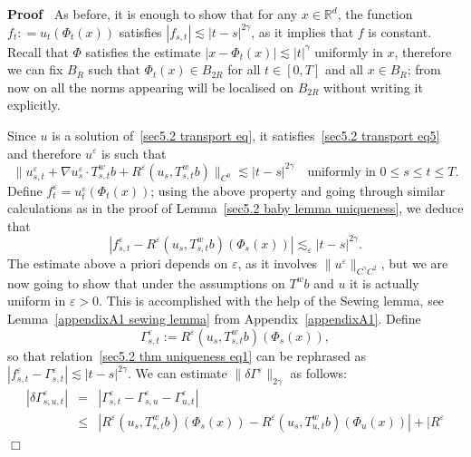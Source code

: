 \documentclass[10pt]{article}
\newcommand{\assign}{:=}
\newenvironment{proof}{\noindent\textbf{Proof\ }}{\hspace*{\fill}$\Box$\medskip}
\begin{document}
\begin{proof}
  As before, it is enough to show that for any $x \in \mathbb{R}^d$, the
  function $f_t : = u_t (\Phi_t (x))$ satisfies $| f_{s, t} | \lesssim | t - s
  |^{2 \gamma}$, as it implies that $f$ is constant. Recall that $\Phi$
  satisfies the estimate $| x - \Phi_t (x) | \lesssim | t |^{\gamma}$
  uniformly in $x$, therefore we can fix $B_R$ such that $\Phi_t (x) \in B_{2
  R}$ for all $t \in [0, T]$ and all $x \in B_R$; from now on all the norms
  appearing will be localised on $B_{2 R}$ without writing it explicitly.
  
  Since $u$ is a solution of~{\eqref{sec5.2 transport eq}}, it
  satisfies~{\eqref{sec5.2 transport eq5}} and therefore $u^{\varepsilon}$ is
  such that
  \[ \| u^{\varepsilon}_{s, t} + \nabla u^{\varepsilon}_s \cdot T^w_{s, t} b +
     R^{\varepsilon} (u_s, T^w_{s, t} b) \|_{C^0} \lesssim | t - s |^{2
     \gamma} \quad \text{uniformly in } 0 \leqslant s \leqslant t \leqslant T.
  \]
  Define $f^{\varepsilon}_t = u^{\varepsilon}_t (\Phi_t (x))$; using the above
  property and going through similar calculations as in the proof of
  Lemma~\ref{sec5.2 baby lemma uniqueness}, we deduce that
  \begin{equation}
    | f^{\varepsilon}_{s, t} - R^{\varepsilon} (u_s, T^w_{s, t} b) (\Phi_s
    (x)) | \lesssim_{\varepsilon} | t - s |^{2 \gamma} . \label{sec5.2 thm
    uniqueness eq1}
  \end{equation}
  The estimate above a priori depends on $\varepsilon$, as it involves $\|
  u^{\varepsilon} \|_{C^{\gamma} C^2}$, but we are now going to show that
  under the assumptions on $T^w b$ and $u$ it is actually uniform in
  $\varepsilon > 0$. This is accomplished with the help of the Sewing lemma,
  see Lemma~\ref{appendixA1 sewing lemma} from Appendix~\ref{appendixA1}.
  Define
  \[ \Gamma^{\varepsilon}_{s, t} \assign R^{\varepsilon} (u_s, T^w_{s, t} b)
     (\Phi_s (x)), \]
  so that relation~{\eqref{sec5.2 thm uniqueness eq1}} can be rephrased as $|
  f^{\varepsilon}_{s, t} - \Gamma^{\varepsilon}_{s, t} | \lesssim | t - s |^{2
  \gamma}$. We can estimate $\| \delta \Gamma^{\varepsilon} \|_{2 \gamma}$ as
  follows:
  \begin{eqnarray*}
    | \delta \Gamma^{\varepsilon}_{s, u, t} | & = & | \Gamma^{\varepsilon}_{s,
    t} - \Gamma^{\varepsilon}_{s, u} - \Gamma^{\varepsilon}_{u, t} |\\
    & \leqslant & | R^{\varepsilon} (u_s, T^w_{s, t} b) (\Phi_s (x)) -
    R^{\varepsilon} (u_s, T^w_{u, t} b) (\Phi_u (x)) | + | R^{\varepsilon}

\end{eqnarray*}
\end{proof}
\end{document}
